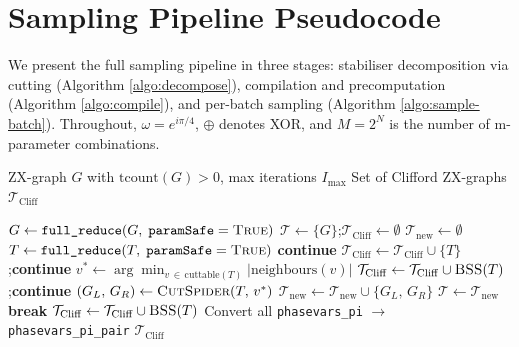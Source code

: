 \documentclass[a4paper,onecolumn,11pt,accepted=2026-06-10]{quantumarticle}
\begin{document}
\appendix 



\onecolumn

\section{Sampling Pipeline Pseudocode}
\label{appendix:pseudocode}

We present the full sampling pipeline in three stages: stabiliser
decomposition via cutting (Algorithm \ref{algo:decompose}), compilation and
precomputation (Algorithm \ref{algo:compile}), and per-batch sampling
(Algorithm \ref{algo:sample-batch}). Throughout, $\omega = e^{i\pi/4}$,
$\oplus$ denotes XOR, and $M = 2^N$ is the number of m-parameter
combinations.

\begin{algorithm}[H]
\small
\caption{Cutting-based stabiliser decomposition.}
\label{algo:decompose}
\begin{algorithmic}[1]
\Input ZX-graph $G$ with $\mathrm{tcount}(G) > 0$, max iterations $I_{\max}$
\Output Set of Clifford ZX-graphs $\mathcal{T}_{\mathrm{Cliff}}$

    \State $G \gets \texttt{full\_reduce}(G,\; \texttt{paramSafe}=\textsc{True})$
    \State $\mathcal{T} \gets \{G\}$;\quad $\mathcal{T}_{\mathrm{Cliff}} \gets \emptyset$
        \State $\mathcal{T}_{\mathrm{new}} \gets \emptyset$
            \State $T \gets \texttt{full\_reduce}(T,\; \texttt{paramSafe}=\textsc{True})$
             \textbf{continue} \EndIf
                $\mathcal{T}_{\mathrm{Cliff}} \gets \mathcal{T}_{\mathrm{Cliff}} \cup \{T\}$;\quad \textbf{continue}
            \EndIf
            \State $v^* \gets \arg\min_{v \,\in\, \mathrm{cuttable}(T)} |\mathrm{neighbours}(v)|$
                \State $\mathcal{T}_{\mathrm{Cliff}} \gets \mathcal{T}_{\mathrm{Cliff}} \cup \textsc{BSS}(T)$;\quad \textbf{continue}
            \EndIf
            \State $(G_L,\, G_R) \gets \textsc{CutSpider}(T,\, v^*)$
            \State $\mathcal{T}_{\mathrm{new}} \gets \mathcal{T}_{\mathrm{new}} \cup \{G_L,\, G_R\}$
        \EndFor
        \State $\mathcal{T} \gets \mathcal{T}_{\mathrm{new}}$
         \textbf{break} \EndIf
    \EndFor
        \State $\mathcal{T}_{\mathrm{Cliff}} \gets \mathcal{T}_{\mathrm{Cliff}} \cup \textsc{BSS}(T)$
    \EndFor
    \State Convert all \texttt{phasevars\_pi} $\to$ \texttt{phasevars\_pi\_pair}
    \State \Return $\mathcal{T}_{\mathrm{Cliff}}$
\EndFunction


\end{algorithmic}
\end{algorithm}
\end{document}
